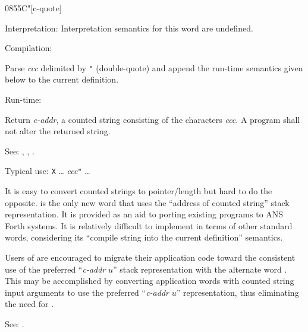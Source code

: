 \begin{newword*}[Cq]{0855}{C"}[c-quote]
\item[Interpretation:]
	Interpretation semantics for this word are undefined.

\item[Compilation:]

	Parse \emph{ccc} delimited by \texttt{"} (double-quote) and
	append the run-time semantics given below to the current
	definition.

\item[Run-time:]

	Return \emph{c-addr}, a counted string consisting of the
	characters \emph{ccc}. A program shall not alter the returned
	string.

\item[See:]
	,
	,
	.

	\begin{rationale} %
		Typical use:
			\word{:} \texttt{X} {\ldots}
				 \emph{ccc}\texttt{"}
			{\ldots} \word{;}

		It is easy to convert counted strings to pointer/length but
		hard to do the opposite.  is the only new word that
		uses the ``address of counted string'' stack representation.
		It is provided as an aid to porting existing programs to ANS
		Forth systems. It is relatively difficult to implement 
		in terms of other standard words, considering its ``compile
		string into the current definition'' semantics.

		Users of  are encouraged to migrate their application
		code toward the consistent use of the preferred ``\emph{c-addr}
		$u$'' stack representation with the alternate word .
		This may be accomplished by converting application words with
		counted string input arguments to use the preferred
		``\emph{c-addr} $u$'' representation, thus eliminating the
		need for .

		See: .
	\end{rationale}
\end{newword*}


